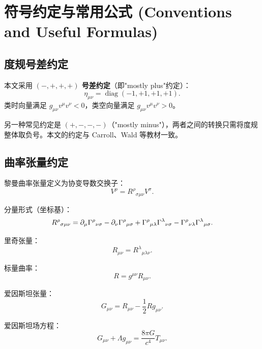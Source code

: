 \chapter{符号约定与常用公式 (Conventions and Useful Formulas)}

\section{度规号差约定}

本文采用 \textbf{$(-,+,+,+)$ 号差约定}（即"mostly plus"约定）：
\begin{equation}
    \eta_{\mu\nu} = \operatorname{diag}(-1, +1, +1, +1).
\end{equation}
类时向量满足 $g_{\mu\nu} v^\mu v^\nu < 0$，类空向量满足 $g_{\mu\nu} v^\mu v^\nu > 0$。

另一种常见约定是 $(+,-,-,-)$（"mostly minus"），两者之间的转换只需将度规整体取负号。本文的约定与 Carroll、Wald 等教材一致。

\section{曲率张量约定}

黎曼曲率张量定义为协变导数交换子：
\begin{equation}
    [\nabla_\mu, \nabla_\nu] V^\rho = R^\rho{}_{\sigma\mu\nu} V^\sigma.
\end{equation}

分量形式（坐标基）：
\begin{equation}
    R^\rho{}_{\sigma\mu\nu} = \partial_\mu \Gamma^\rho{}_{\nu\sigma} - \partial_\nu \Gamma^\rho{}_{\mu\sigma} + \Gamma^\rho{}_{\mu\lambda}\Gamma^\lambda{}_{\nu\sigma} - \Gamma^\rho{}_{\nu\lambda}\Gamma^\lambda{}_{\mu\sigma}.
\end{equation}

里奇张量：
\begin{equation}
    R_{\mu\nu} = R^\lambda{}_{\mu\lambda\nu}.
\end{equation}

标量曲率：
\begin{equation}
    R = g^{\mu\nu} R_{\mu\nu}.
\end{equation}

爱因斯坦张量：
\begin{equation}
    G_{\mu\nu} = R_{\mu\nu} - \frac{1}{2} R g_{\mu\nu}.
\end{equation}

爱因斯坦场方程：
\begin{equation}
    G_{\mu\nu} + \Lambda g_{\mu\nu} = \frac{8\pi G}{c^4} T_{\mu\nu}.
\end{equation}

